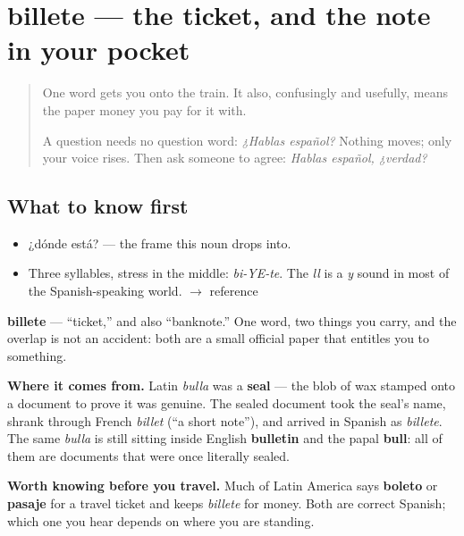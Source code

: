 \section[billete]{billete — the ticket, and the note in your pocket}

\label{lesson:ES-C268-billete}



\begin{quote}
One word gets you onto the train. It also, confusingly and usefully, means the paper money you pay for it with.

A question needs no question word: \emph{¿Hablas español?} Nothing moves; only your voice rises. Then ask someone to agree: \emph{Hablas español, ¿verdad?}
\end{quote}

\subsection*{What to know first}
\begin{itemize}
\raggedright
  \item ¿dónde está? — the frame this noun drops into.
\end{itemize}

\begin{sounds}
\begin{itemize}
\raggedright
  \item Three syllables, stress in the middle: \emph{bi-YE-te}. The \emph{ll} is a \emph{y} sound in most of the Spanish-speaking world. $\to$ reference
\end{itemize}
\end{sounds}

\begin{cousinweb}
\textbf{billete} — \textquotedblleft{}ticket,\textquotedblright{} and also \textquotedblleft{}banknote.\textquotedblright{} One word, two things you carry, and the overlap is not an accident: both are a small official paper that entitles you to something.

\textbf{Where it comes from.} Latin \emph{bulla} was a \textbf{seal} — the blob of wax stamped onto a document to prove it was genuine. The sealed document took the seal's name, shrank through French \emph{billet} (\textquotedblleft{}a short note\textquotedblright{}), and arrived in Spanish as \emph{billete}. The same \emph{bulla} is still sitting inside English \textbf{bulletin} and the papal \textbf{bull}: all of them are documents that were once literally sealed.

\textbf{Worth knowing before you travel.} Much of Latin America says \textbf{boleto} or \textbf{pasaje} for a travel ticket and keeps \emph{billete} for money. Both are correct Spanish; which one you hear depends on where you are standing.
\end{cousinweb}

